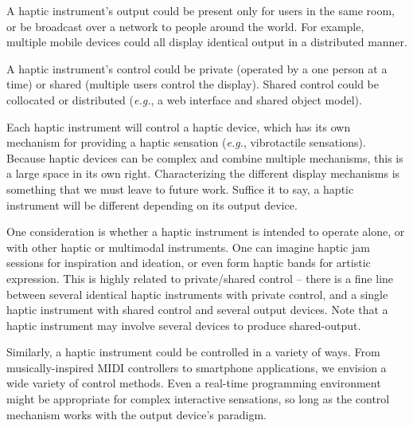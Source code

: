 	 A haptic instrument's output could be present only for users in the same room, or be broadcast over a network to people around the world. For example, multiple mobile devices could all display identical output in a distributed manner.

	 A haptic instrument's control %
 could be private (operated by a one person at a time) or shared (multiple users control the display). 
Shared control could be collocated or distributed (\emph{e.g.}, a web interface and shared object model).
	
	 Each haptic instrument will control a haptic device, which has its own mechanism for providing a haptic sensation (\emph{e.g.}, vibrotactile sensations). Because haptic devices can be complex and combine multiple mechanisms, this is a large space in its own right. Characterizing the different display mechanisms is something that we must leave to future work. Suffice it to say, a haptic instrument will be different depending on its output device.

	One consideration is whether a haptic instrument is intended to operate alone, or with other haptic or multimodal instruments.
	One can imagine haptic jam sessions for inspiration and ideation, or even form haptic bands for artistic expression.
	This is highly related to private/shared control -- there is a fine line between several identical haptic instruments with private control, and a single haptic instrument with shared control and several output devices. Note that a haptic instrument may involve several devices to produce shared-output.

	 Similarly, a haptic instrument could be controlled in a variety of ways.
	From musically-inspired MIDI controllers to smartphone applications, we envision a wide variety of control methods.
	Even a real-time programming environment might be appropriate for complex interactive sensations,
	so long as the control mechanism works with the output device's paradigm.

